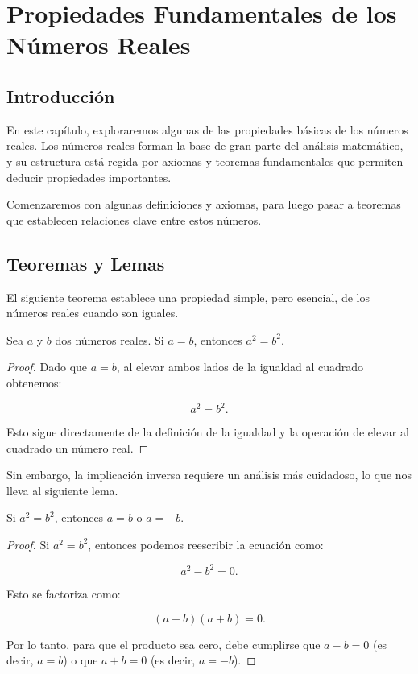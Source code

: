 \chapter{Propiedades Fundamentales de los Números Reales}

\section{Introducción}

En este capítulo, exploraremos algunas de las propiedades básicas de los números reales. Los números reales forman la base de gran parte del análisis matemático, y su estructura está regida por axiomas y teoremas fundamentales que permiten deducir propiedades importantes.

Comenzaremos con algunas definiciones y axiomas, para luego pasar a teoremas que establecen relaciones clave entre estos números.

\section{Teoremas y Lemas}

El siguiente teorema establece una propiedad simple, pero esencial, de los números reales cuando son iguales.

\begin{theorem}
Sea $a$ y $b$ dos números reales. Si $a = b$, entonces $a^2 = b^2$.
\end{theorem}

\begin{proof}
Dado que $a = b$, al elevar ambos lados de la igualdad al cuadrado obtenemos:

\[
a^2 = b^2.
\]

Esto sigue directamente de la definición de la igualdad y la operación de elevar al cuadrado un número real.
\end{proof}

Sin embargo, la implicación inversa requiere un análisis más cuidadoso, lo que nos lleva al siguiente lema.

\begin{lemma}
Si $a^2 = b^2$, entonces $a = b$ o $a = -b$.
\end{lemma}

\begin{proof}
Si $a^2 = b^2$, entonces podemos reescribir la ecuación como:

\[
a^2 - b^2 = 0.
\]

Esto se factoriza como:

\[
(a - b)(a + b) = 0.
\]

Por lo tanto, para que el producto sea cero, debe cumplirse que $a - b = 0$ (es decir, $a = b$) o que $a + b = 0$ (es decir, $a = -b$).
\end{proof}

